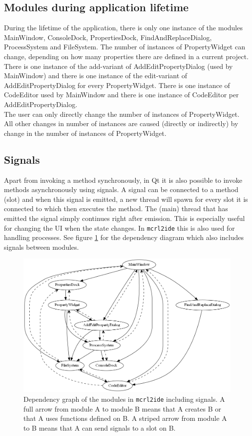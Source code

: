 \documentclass[a4paper, fleqn]{article}
\begin{document}
\subsection{Modules during application lifetime}
During the lifetime of the application, there is only one instance of the modules MainWindow, ConsoleDock, PropertiesDock, FindAndReplaceDialog, ProcessSystem and FileSystem. The number of instances of PropertyWidget can change, depending on how many properties there are defined in a current project. There is one instance of the add-variant of AddEditPropertyDialog (used by MainWindow) and there is one instance of the edit-variant of AddEditPropertyDialog for every PropertyWidget. There is one instance of CodeEditor used by MainWindow and there is one instance of CodeEditor per AddEditPropertyDialog.\\
The user can only directly change the number of instances of PropertyWidget. All other changes in number of instances are caused (directly or indirectly) by change in the number of instances of PropertyWidget.


\subsection{Signals}
Apart from invoking a method synchronously, in Qt it is also possible to invoke methods asynchronously using signals. A signal can be connected to a method (slot) and when this signal is emitted, a new thread will spawn for every slot it is connected to which then executes the method. The (main) thread that has emitted the signal simply continues right after emission. This is especially useful for changing the UI when the state changes. In \texttt{mcrl2ide} this is also used for handling processes. See figure \ref{classdepgraphwithsignals} for the dependency diagram which also includes signals between modules.

\begin{figure}[b!]
\includegraphics[width=\textwidth]{classDependencyGraphWithSignals.png}
\caption{Dependency graph of the modules in \texttt{mcrl2ide} including signals. A full arrow from module A to module B means that A creates B or that A uses functions defined on B. A striped arrow from module A to B means that A can send signals to a slot on B.}
\label{classdepgraphwithsignals}
\end{figure}
\end{document}
